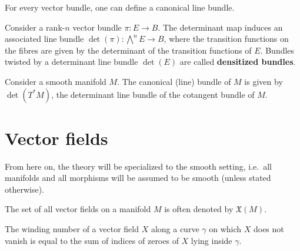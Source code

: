     For every vector bundle, one can define a canonical line bundle.
    \begin{construct}
        Consider a rank-$n$ vector bundle $\pi:E\rightarrow B$. The determinant map induces an associated line bundle $\det(\pi):\bigwedge^nE\rightarrow B$, where the transition functions on the fibres are given by the determinant of the transition functions of $E$. Bundles twisted by a determinant line bundle $\det(E)$ are called \textbf{densitized bundles}.
    \end{construct}
    \begin{example}\label{bundle:canonical_bundle}
        Consider a smooth manifold $M$. The canonical (line) bundle of $M$ is given by $\det(T^*M)$, the determinant line bundle of the cotangent bundle of $M$.
    \end{example}

\section{Vector fields}

    From here on, the theory will be specialized to the smooth setting, i.e.~all manifolds and all morphisms will be assumed to be smooth (unless stated otherwise).

    \begin{notation}
        The set of all vector fields on a manifold $M$ is often denoted by $\mathfrak{X}(M)$.
    \end{notation}

    \begin{property}
        The winding number of a vector field $X$ along a curve $\gamma$ on which $X$ does not vanish is equal to the sum of indices of zeroes of $X$ lying inside $\gamma$.
    \end{property}

